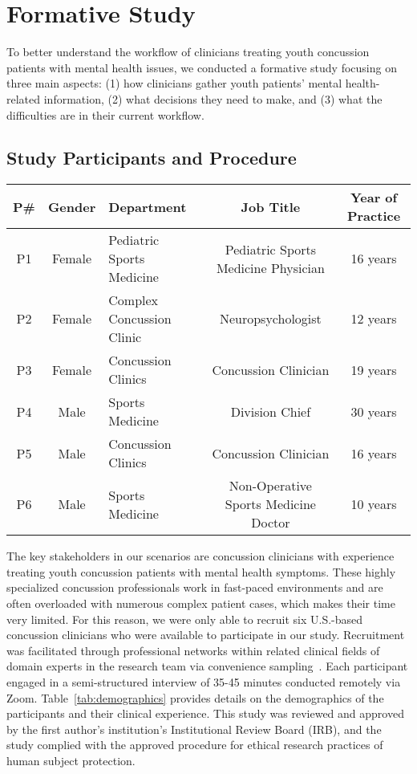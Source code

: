 \section{Formative Study}
\label{sec:formative}

To better understand the workflow of clinicians treating youth concussion patients with mental health issues, we conducted a formative study focusing on three main aspects: (1) how clinicians gather youth patients' mental health-related information, (2) what decisions they need to make, and (3) what the difficulties are in their current workflow. 

\subsection{Study Participants and Procedure}
\label{sec:formative-design}

\begin{table*}
  \caption{Demographics of Participants in Our Formative Study}
  \label{tab:demographics}
  \begin{tabular}{cclcc} 
    \toprule
    P\# & Gender & Department & Job Title & Year of Practice \\ 
    \midrule
    P1 & Female & Pediatric Sports Medicine & Pediatric Sports Medicine Physician & 16 years \\ 
    P2 & Female & Complex Concussion Clinic & Neuropsychologist  & 12 years \\
    P3 & Female & Concussion Clinics & Concussion Clinician & 19 years \\ 
    P4 & Male & Sports Medicine & Division Chief & 30 years \\ 
    P5 & Male & Concussion Clinics & Concussion Clinician & 16 years \\ 
    P6 & Male & Sports Medicine & Non-Operative 
Sports Medicine Doctor & 10 years \\ 
    \bottomrule
  \end{tabular}
\end{table*}

The key stakeholders in our scenarios are concussion clinicians with experience treating youth concussion patients with mental health symptoms. 
These highly specialized concussion professionals work in fast-paced environments and are often overloaded with numerous complex patient cases, which makes their time very limited. 
For this reason, we were only able to recruit six U.S.-based concussion clinicians who were available to participate in our study.
Recruitment was facilitated through professional networks within related clinical fields of domain experts in the research team via convenience sampling~\cite{sedgwick2013convenience}.
Each participant engaged in a semi-structured interview of 35-45 minutes conducted remotely via Zoom. 
Table~\ref{tab:demographics} provides details on the demographics of the participants and their clinical experience. 
This study was reviewed and approved by the first author's institution's Institutional Review Board (IRB), and the study complied with the approved procedure for ethical research practices of human subject protection.






